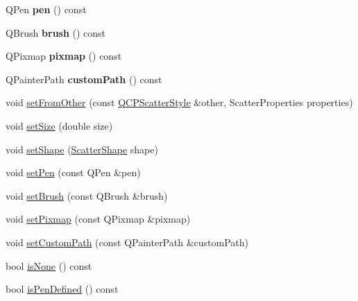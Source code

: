 \begin{DoxyCompactItemize}
\mbox{\label{class_q_c_p_scatter_style_acdd6313d16e69d3810e9d1f48dd9e4bb}} 
Q\+Pen {\bfseries pen} () const
\item 
\mbox{\label{class_q_c_p_scatter_style_adc4f66aed84f1d7a3a5aabf4f48f31a6}} 
Q\+Brush {\bfseries brush} () const
\item 
\mbox{\label{class_q_c_p_scatter_style_a9b2d1a2ec0aac0c74f7582d14050e93a}} 
Q\+Pixmap {\bfseries pixmap} () const
\item 
\mbox{\label{class_q_c_p_scatter_style_aef1fac84c9830fd97f2a8568e605e372}} 
Q\+Painter\+Path {\bfseries custom\+Path} () const
\item 
void \mbox{\hyperlink{class_q_c_p_scatter_style_a7d59ba8864914f765817841089e436f1}{set\+From\+Other}} (const \mbox{\hyperlink{class_q_c_p_scatter_style}{Q\+C\+P\+Scatter\+Style}} \&other, Scatter\+Properties properties)
\item 
void \mbox{\hyperlink{class_q_c_p_scatter_style_aaefdd031052892c4136129db68596e0f}{set\+Size}} (double size)
\item 
void \mbox{\hyperlink{class_q_c_p_scatter_style_a7c641c4d4c6d29cb705d3887cfce91c1}{set\+Shape}} (\mbox{\hyperlink{class_q_c_p_scatter_style_adb31525af6b680e6f1b7472e43859349}{Scatter\+Shape}} shape)
\item 
void \mbox{\hyperlink{class_q_c_p_scatter_style_a761f1f229cc0ca4703e1e2b89f6dd1ba}{set\+Pen}} (const Q\+Pen \&pen)
\item 
void \mbox{\hyperlink{class_q_c_p_scatter_style_a74d692aaeb8d4b36d6f7d510e44264b1}{set\+Brush}} (const Q\+Brush \&brush)
\item 
void \mbox{\hyperlink{class_q_c_p_scatter_style_a5fb611d46acfac520d7b89a1c71d9246}{set\+Pixmap}} (const Q\+Pixmap \&pixmap)
\item 
void \mbox{\hyperlink{class_q_c_p_scatter_style_a96a3e949f90b2afe5677ca9412a12a1e}{set\+Custom\+Path}} (const Q\+Painter\+Path \&custom\+Path)
\item 
bool \mbox{\hyperlink{class_q_c_p_scatter_style_a72db6bcb1e1abd6e53c1315dd3dea7e4}{is\+None}} () const
\item 
bool \mbox{\hyperlink{class_q_c_p_scatter_style_a47077eb6450fe9a788f833e4ec1b1d5a}{is\+Pen\+Defined}} () const
\item 

\end{DoxyCompactItemize}
